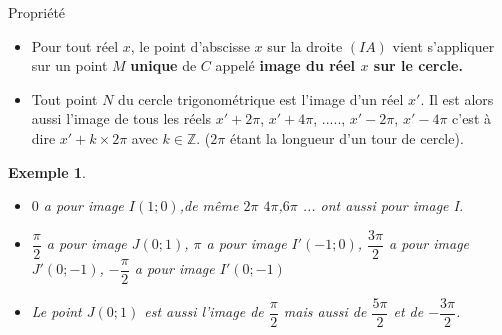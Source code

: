 \documentclass[10pt,a4paper]{article}
\theoremstyle{break}
\newtheorem{Ex}{Exemple}
\begin{document}
		
	\begin{bclogo}[couleur = red!25, arrondi = 0.1,logo=\bcbook]{Propriété}
			\begin{itemize}
				\item Pour tout réel $x$, le point d'abscisse $x$ sur la droite $(IA)$ vient s'appliquer sur un point $M$ \textbf{unique} de $C$ appelé\textbf{ image du réel $x$ sur le cercle.}\\
				\item Tout point $N$ du cercle trigonométrique est l'image d'un réel $x'$. Il est alors aussi l'image de tous les réels $x'+2\pi$, $x'+4\pi$, ....., $x'-2\pi$, $x'-4\pi$ c'est à dire $x'+k\times 2\pi$ avec $k\in \mathbb{Z}$. ($2\pi$ étant la longueur d'un tour de cercle).
				
			\end{itemize}
		\end{bclogo}
		\begin{Ex}\begin{itemize}
				\item $0$ a pour image $I(1;0)$,de même $2\pi$ $4\pi$,$6\pi$ ... ont aussi pour image I.\\
				\item  $\dfrac{\pi}{2}$ a pour image $J(0;1)$, $\pi$ a pour image $I'(-1;0)$, $\dfrac{3\pi}{2}$ a pour image $J'(0;-1)$, $-\dfrac{\pi}{2}$ a pour image $I'(0;-1)$
				\item Le point $J(0;1)$ est aussi l'image de $\dfrac{\pi}{2}$ mais aussi de $\dfrac{5\pi}{2}$ et de $-\dfrac{3\pi}{2}$.
			\end{itemize}
			
		\end{Ex}
\end{document}
